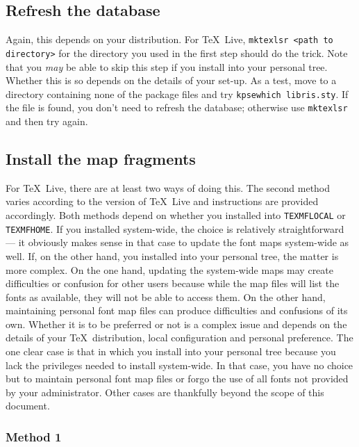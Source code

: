 \documentclass[11pt,british]{article}
\begin{document}
\subsection{Refresh the database}

Again, this depends on your distribution. For \TeX~Live, \verb|mktexlsr <path to directory>| for the directory you used in the first step should do the trick. Note that you \emph{may} be able to skip this step if you install into your personal tree. Whether this is so depends on the details of your set-up. As a test, move to a directory containing none of the package files and try \verb|kpsewhich libris.sty|. If the file is found, you don't need to refresh the database; otherwise use \verb|mktexlsr| and then try again.

\subsection{Install the map fragments}

For \TeX~Live, there are at least two ways of doing this. The second method varies according to the version of \TeX~Live and instructions are provided accordingly. Both methods depend on whether you installed into \verb|TEXMFLOCAL| or \verb|TEXMFHOME|. If you installed system-wide, the choice is relatively straightforward --- it obviously makes sense in that case to update the font maps system-wide as well. If, on the other hand, you installed into your personal tree, the matter is more complex. On the one hand, updating the system-wide maps may create difficulties or confusion for other users because while the map files will list the fonts as available, they will not be able to access them. On the other hand, maintaining personal font map files can produce difficulties and confusions of its own. Whether it is to be preferred or not is a complex issue and depends on the details of your \TeX\ distribution, local configuration and personal preference. The one clear case is that in which you install into your personal tree because you lack the privileges needed to install system-wide. In that case, you have no choice but to maintain personal font map files or forgo the use of all fonts not provided by your administrator. Other cases are thankfully beyond the scope of this document.

\subsubsection{Method 1}
\end{document}

